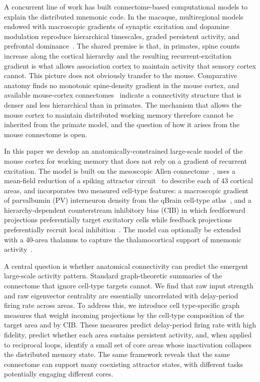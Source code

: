 \documentclass[11pt]{article}
\begin{document}
A concurrent line of work has built connectome-based computational models to explain the distributed mnemonic code. In the macaque, multiregional models endowed with macroscopic gradients of synaptic excitation and dopamine modulation reproduce hierarchical timescales, graded persistent activity, and prefrontal dominance~\cite{murray2014hierarchy,mejias2022mechanisms,froudistwalsh2021dopamine}. The shared premise is that, in primates, spine counts increase along the cortical hierarchy and the resulting recurrent-excitation gradient is what allows association cortex to maintain activity that sensory cortex cannot. This picture does not obviously transfer to the mouse. Comparative anatomy finds no monotonic spine-density gradient in the mouse cortex, and available mouse-cortex connectomes~\cite{oh2014mesoscale,gamanut2018mouse,knox2018highresolution,harris2019hierarchical} indicate a connectivity structure that is denser and less hierarchical than in primates. The mechanism that allows the mouse cortex to maintain distributed working memory therefore cannot be inherited from the primate model, and the question of how it arises from the mouse connectome is open.

In this paper we develop an anatomically-constrained large-scale model of the mouse cortex for working memory that does not rely on a gradient of recurrent excitation. The model is built on the mesoscopic Allen connectome~\cite{oh2014mesoscale,harris2019hierarchical,knox2018highresolution}, uses a mean-field reduction of a spiking attractor circuit~\cite{wang2002probabilistic,wongwang2006recurrent} to describe each of 43 cortical areas, and incorporates two measured cell-type features: a macroscopic gradient of parvalbumin (PV) interneuron density from the qBrain cell-type atlas~\cite{kim2017braintype}, and a hierarchy-dependent counterstream inhibitory bias (CIB) in which feedforward projections preferentially target excitatory cells while feedback projections preferentially recruit local inhibition~\cite{mejias2022mechanisms,wang2020macroscopic}. The model can optionally be extended with a 40-area thalamus to capture the thalamocortical support of mnemonic activity~\cite{guo2017maintenance,bolkan2017thalamic,schmitt2017thalamic}.

A central question is whether anatomical connectivity can predict the emergent large-scale activity pattern. Standard graph-theoretic summaries of the connectome that ignore cell-type targets cannot. We find that raw input strength and raw eigenvector centrality are essentially uncorrelated with delay-period firing rate across areas. To address this, we introduce cell type-specific graph measures that weight incoming projections by the cell-type composition of the target area and by CIB. These measures predict delay-period firing rate with high fidelity, predict whether each area sustains persistent activity, and, when applied to reciprocal loops, identify a small set of core areas whose inactivation collapses the distributed memory state. The same framework reveals that the same connectome can support many coexisting attractor states, with different tasks potentially engaging different cores.
\end{document}
